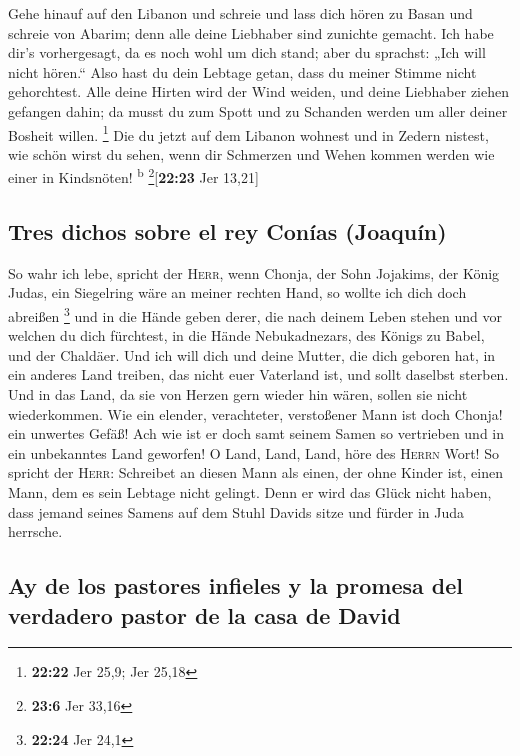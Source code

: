  Gehe hinauf auf den Libanon und schreie und lass dich
hören zu Basan und schreie von Abarim; denn alle deine Liebhaber sind
zunichte gemacht.  Ich habe dir's vorhergesagt, da es
noch wohl um dich stand; aber du sprachst: „Ich will nicht hören.`` Also
hast du dein Lebtage getan, dass du meiner Stimme nicht gehorchtest.
 Alle deine Hirten wird der Wind weiden, und deine
Liebhaber ziehen gefangen dahin; da musst du zum Spott und zu Schanden
werden um aller deiner Bosheit willen. \footnote{\textbf{22:22} Jer
  25,9; Jer 25,18}  Die du jetzt auf dem Libanon wohnest
und in Zedern nistest, wie schön wirst du sehen, wenn dir Schmerzen und
Wehen kommen werden wie einer in Kindsnöten! \textsuperscript{b}
\footnote{\textbf{23:6} Jer 33,16}{[}\textbf{22:23} Jer 13,21{]}

\hypertarget{tres-dichos-sobre-el-rey-conuxedas-joaquuxedn}{%
\subsection{Tres dichos sobre el rey Conías
(Joaquín)}\label{tres-dichos-sobre-el-rey-conuxedas-joaquuxedn}}

 So wahr ich lebe, spricht der \textsc{Herr}, wenn
Chonja, der Sohn Jojakims, der König Judas, ein Siegelring wäre an
meiner rechten Hand, so wollte ich dich doch abreißen \footnote{\textbf{22:24}
  Jer 24,1}  und in die Hände geben derer, die nach
deinem Leben stehen und vor welchen du dich fürchtest, in die Hände
Nebukadnezars, des Königs zu Babel, und der Chaldäer. 
Und ich will dich und deine Mutter, die dich geboren hat, in ein anderes
Land treiben, das nicht euer Vaterland ist, und sollt daselbst sterben.
 Und in das Land, da sie von Herzen gern wieder hin
wären, sollen sie nicht wiederkommen.  Wie ein elender,
verachteter, verstoßener Mann ist doch Chonja! ein unwertes Gefäß! Ach
wie ist er doch samt seinem Samen so vertrieben und in ein unbekanntes
Land geworfen!  O Land, Land, Land, höre des
\textsc{Herrn} Wort!  So spricht der \textsc{Herr}:
Schreibet an diesen Mann als einen, der ohne Kinder ist, einen Mann, dem
es sein Lebtage nicht gelingt. Denn er wird das Glück nicht haben, dass
jemand seines Samens auf dem Stuhl Davids sitze und fürder in Juda
herrsche.

\hypertarget{ay-de-los-pastores-infieles-y-la-promesa-del-verdadero-pastor-de-la-casa-de-david}{%
\subsection{Ay de los pastores infieles y la promesa del verdadero
pastor de la casa de
David}\label{ay-de-los-pastores-infieles-y-la-promesa-del-verdadero-pastor-de-la-casa-de-david}}

